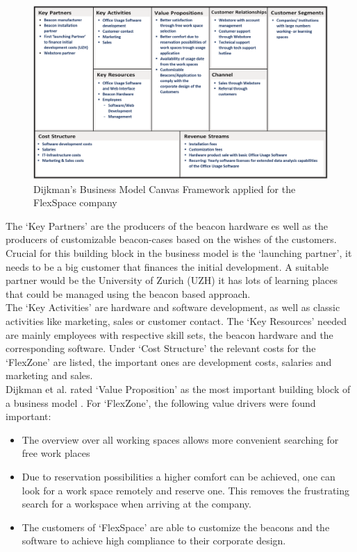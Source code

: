 			\begin{figure}[ht]
			    \begin{center}
			    \includegraphics[scale=0.45]{Talk11/bmc_flex.png}
			    \end{center}
			    \caption{Dijkman's Business Model Canvas Framework applied for the FlexSpace company}
			    \label{fig:bmc_flex}
			\end{figure}
	The `Key Partners' are the producers of the beacon hardware es well as the producers of customizable beacon-cases based on the wishes of the customers. Crucial for this building block in the business model is the `launching partner', it needs to be a big customer that finances the initial development. A suitable partner would be the University of Zurich (UZH) it has lots of learning places that could be managed using the beacon based approach.\\
	The `Key Activities' are hardware and software development, as well as classic activities like marketing, sales or customer contact. The 	`Key Resources' needed are mainly employees with respective skill sets, the beacon hardware and the corresponding software. Under `Cost Structure' the relevant costs for the `FlexZone' are listed, the important ones are development costs, salaries and marketing and sales.\\
	Dijkman et al.  rated `Value Proposition' as the most important building block of a business model \cite{dijkman}. For `FlexZone', the following value drivers were found important:
	\begin{itemize}
		\item The overview over all working spaces allows more convenient searching for free work places
		\item Due to reservation possibilities a higher comfort can be achieved, one can look for a work space remotely and reserve one. This removes the frustrating search for a workspace when arriving at the company.
		\item The customers of `FlexSpace' are able to customize the beacons and the software to achieve high compliance to their corporate design.  
	\end{itemize}  

